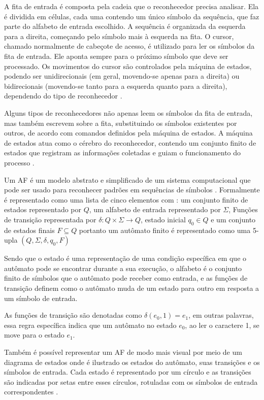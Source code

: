 A fita de entrada é composta pela cadeia que o reconhecedor precisa analisar. Ela é dividida em células, cada uma contendo um único símbolo da sequência, que faz parte do alfabeto de entrada escolhido. A sequência é organizada da esquerda para a direita, começando pelo símbolo mais à esquerda na fita. O cursor, chamado normalmente de cabeçote de acesso, é utilizado para ler os símbolos da fita de entrada. Ele aponta sempre para o próximo símbolo que deve ser processado. Os movimentos do cursor são controlados pela máquina de estados, podendo ser unidirecionais (em geral, movendo-se apenas para a direita) ou bidirecionais (movendo-se tanto para a esquerda quanto para a direita), dependendo do tipo de reconhecedor \cite{reconhecimento}.

Alguns tipos de reconhecedores não apenas leem os símbolos da fita de entrada, mas também escrevem sobre a fita, substituindo os símbolos existentes por outros, de acordo com comandos definidos pela máquina de estados. A máquina de estados atua como o cérebro do reconhecedor, contendo um conjunto finito de estados que registram as informações coletadas e guiam o funcionamento do processo \cite{reconhecimento}.


Um \ac{AF} é um modelo abstrato e simplificado de um sistema computacional que pode ser usado para reconhecer padrões em sequências de símbolos \cite{afd}. Formalmente é representado como uma lista de cinco elementos  com : 
um conjunto finito de estados representado por $Q$, um alfabeto de entrada representado por $\Sigma$, Funções de transição representada por $\delta : Q \times \Sigma \rightarrow Q$, estado inicial $q_0 \in Q$ e um conjunto de estados finais $F \subseteq Q$ portanto um autômato finito é representado como uma 5-upla $(Q, \Sigma, \delta, q_0, F)$

Sendo que o estado é uma representação de uma condição específica em que o autômato pode se encontrar durante a sua execução, o alfabeto é o conjunto finito de símbolos que o autômato pode receber como entrada, e as funções de transição definem como o autômato muda de um estado para outro em resposta a um símbolo de entrada.

As funções de transição são denotadas como $\delta(e_0, 1) = e_1$, em outras palavras, essa regra específica indica que um autômato no estado $e_0$, ao ler o caractere 1, se move para o estado $e_1$.

Também é possível representar um \ac{AF} de modo mais visual por meio de um diagrama de estados onde é ilustrado os estados do autômato, suas transições e os símbolos de entrada. Cada estado é representado por um círculo e as transições são indicadas por setas entre esses círculos, rotuladas com os símbolos de entrada correspondentes \cite{afd}.

